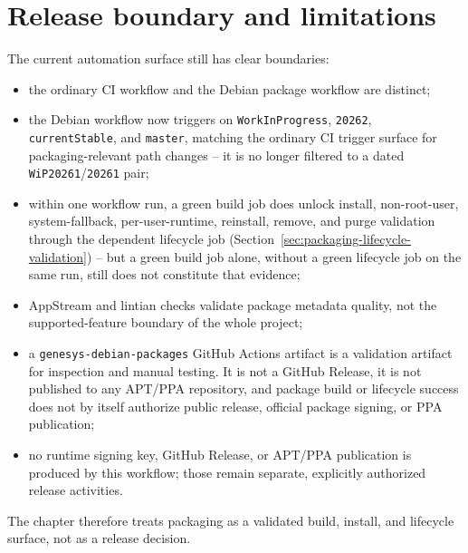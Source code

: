 \section{Release boundary and limitations}
\label{sec:packaging-release-boundary}

The current automation surface still has clear boundaries:
\begin{itemize}
\item the ordinary CI workflow and the Debian package workflow are distinct;
\item the Debian workflow now triggers on \texttt{WorkInProgress},
  \texttt{20262}, \texttt{currentStable}, and \texttt{master}, matching the
  ordinary CI trigger surface for packaging-relevant path changes -- it is no
  longer filtered to a dated \texttt{WiP20261}/\texttt{20261} pair;
\item within one workflow run, a green build job does unlock install,
  non-root-user, system-fallback, per-user-runtime, reinstall, remove, and
  purge validation through the dependent lifecycle job
  (Section~\ref{sec:packaging-lifecycle-validation}) -- but a green build job
  alone, without a green lifecycle job on the same run, still does not
  constitute that evidence;
\item AppStream and lintian checks validate package metadata quality, not the
  supported-feature boundary of the whole project;
\item a \texttt{genesys-debian-packages} GitHub Actions artifact is a
  validation artifact for inspection and manual testing. It is not a GitHub
  Release, it is not published to any APT/PPA repository, and package build
  or lifecycle success does not by itself authorize public release,
  official package signing, or PPA publication;
\item no runtime signing key, GitHub Release, or APT/PPA publication is
  produced by this workflow; those remain separate, explicitly authorized
  release activities.
\end{itemize}

The chapter therefore treats packaging as a validated build, install, and
lifecycle surface, not as a release decision.

